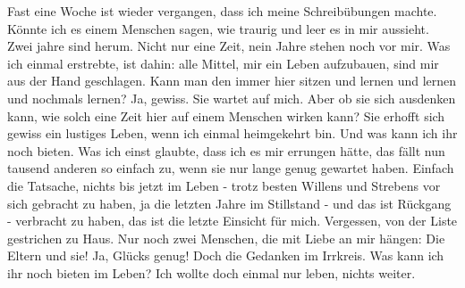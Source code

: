 \def\day{13. Mai 1943.}
\mktitle

Fast eine Woche ist wieder vergangen, dass ich meine Schreib\"{u}bungen machte.
K\"{o}nnte ich es einem Menschen sagen, wie traurig und leer es in mir aussieht.
Zwei jahre sind herum.
Nicht nur eine Zeit, nein Jahre stehen noch vor mir.
Was ich einmal erstrebte, ist dahin: alle Mittel, mir ein Leben aufzubauen, sind mir aus der Hand geschlagen.
Kann man den immer hier sitzen und lernen und lernen und nochmals lernen?
Ja, gewiss.
Sie wartet auf mich.
Aber ob sie sich ausdenken kann, wie solch eine Zeit hier auf einem Menschen wirken kann?
Sie erhofft sich gewiss ein lustiges Leben, wenn ich einmal heimgekehrt bin.
Und was kann ich ihr noch bieten.
Was ich einst glaubte, dass ich es mir errungen h\"{a}tte, das f\"{a}llt nun tausend anderen so einfach zu, wenn sie nur lange genug gewartet haben.
Einfach die Tatsache, nichts bis jetzt im Leben - trotz besten Willens und Strebens vor sich gebracht zu haben, ja die letzten Jahre im Stillstand - und das ist R\"{u}ckgang - verbracht zu haben, das ist die letzte Einsicht f\"{u}r mich.
Vergessen, von der Liste gestrichen zu Haus.
Nur noch zwei Menschen, die mit Liebe an mir h\"{a}ngen: Die Eltern und sie!
Ja, Gl\"{u}cks genug!
Doch die Gedanken im Irrkreis.
Was kann ich ihr noch bieten im Leben?
Ich wollte doch einmal nur leben, nichts weiter.

\clearpage
